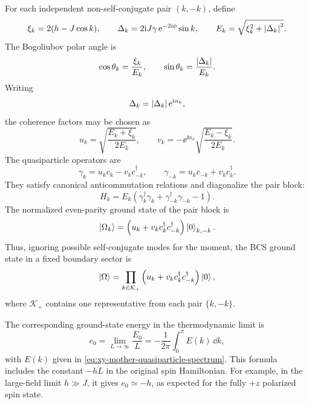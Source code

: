 For each independent non-self-conjugate pair $(k,-k)$, define
\begin{equation}
\label{eq:xy-mother-pair-xi-delta}
    \xi_k=2(h-J\cos k),
    \qquad
    \Delta_k=2\mathrm{i} J\gamma\,\mathrm{e}^{-2\mathrm{i}\phi}\sin k,
    \qquad
    E_k=\sqrt{\xi_k^2+\left|\Delta_k\right|^2}.
\end{equation}
The Bogoliubov polar angle is
\begin{equation}
\label{eq:xy-mother-bogoliubov-angle}
    \cos\theta_k=\frac{\xi_k}{E_k},
    \qquad
    \sin\theta_k=\frac{\left|\Delta_k\right|}{E_k}.
\end{equation}
Writing
\begin{equation}
    \Delta_k=\left|\Delta_k\right|\mathrm{e}^{\mathrm{i}\alpha_k},
\end{equation}
the coherence factors may be chosen as
\begin{equation}
\label{eq:xy-mother-coherence-factors}
    u_k=
    \sqrt{\frac{E_k+\xi_k}{2E_k}},
    \qquad
    v_k=
    -\ee^{\ii\alpha_k}
    \sqrt{\frac{E_k-\xi_k}{2E_k}}.
\end{equation}
The quasiparticle operators are
\begin{equation}
\label{eq:xy-mother-quasiparticle-operators}
    \gamma_k=u_kc_k-v_kc_{-k}^\dagger,
    \qquad
    \gamma_{-k}=u_kc_{-k}+v_kc_k^\dagger.
\end{equation}
They satisfy canonical anticommutation relations and diagonalize the pair block:
\begin{equation}
\label{eq:xy-mother-pair-diagonal}
    H_k
    =
    E_k
    \left(
        \gamma_k^\dagger\gamma_k
        +
        \gamma_{-k}^\dagger\gamma_{-k}
        -1
    \right).
\end{equation}
The normalized even-parity ground state of the pair block is
\begin{equation}
\label{eq:xy-mother-pair-ground-state}
    \left|\Omega_k\right\rangle
    =
    \left(
        u_k+v_k c_k^\dagger c_{-k}^\dagger
    \right)
    \left|0\right\rangle_{k,-k}.
\end{equation}
Thus, ignoring possible self-conjugate modes for the moment, the BCS ground state
in a fixed boundary sector is
\begin{equation}
\label{eq:xy-mother-bcs-ground-state}
    \left|\Omega\right\rangle
    =
    \prod_{k\in\mathcal{K}_+}
    \left(
        u_k+v_k c_k^\dagger c_{-k}^\dagger
    \right)
    \left|0\right\rangle,
\end{equation}
where $\mathcal{K}_+$ contains one representative from each pair $\{k,-k\}$.

The corresponding ground-state energy in the thermodynamic limit is
\begin{equation}
\label{eq:xy-mother-ground-state-energy-density}
    e_0
    =
    \lim_{L\to\infty}\frac{E_0}{L}
    =
    -\frac{1}{2\pi}\int_0^\pi E(k)\,\dd k,
\end{equation}
with $E(k)$ given in \cref{eq:xy-mother-quasiparticle-spectrum}.  This formula
includes the constant $-hL$ in the original spin Hamiltonian.  For example, in
the large-field limit $h\gg J$, it gives $e_0\simeq -h$, as expected for the
fully $+z$ polarized spin state.

